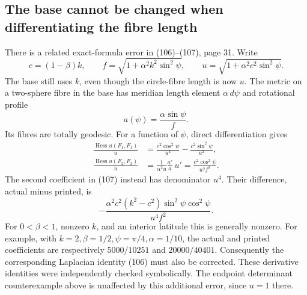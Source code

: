 \documentclass[10pt]{article}
\begin{document}
\subsection*{The base cannot be changed when differentiating the fibre length}
There is a related exact-formula error in (106)–(107), page 31. Write \[c=(1-\beta)k,\qquad
f=\sqrt{1+\alpha^2k^2\sin^2\psi},\qquad
u=\sqrt{1+\alpha^2c^2\sin^2\psi}.\] The base still uses \(k\), even though the circle-fibre length is now \(u\). The metric on a two-sphere fibre in the base has meridian length element \(\alpha\,d\psi\) and rotational profile \[a(\psi)=\frac{\alpha\sin\psi}{f}.\] Its fibres are totally geodesic. For a function of \(\psi\), direct differentiation gives \[\begin{aligned}
\frac{\operatorname{Hess}u(F_1,F_1)}{u}
 &=\frac{c^2\cos^2\psi}{u^4}-\frac{c^2\sin^2\psi}{u^2},\\
\frac{\operatorname{Hess}u(F_2,F_2)}{u}
 &=\frac{1}{\alpha^2u}\frac{a'}a\,u'
 =\frac{c^2\cos^2\psi}{u^2f^2}.\end{aligned}\] The second coefficient in (107) instead has denominator \(u^4\). Their difference, actual minus printed, is \[-\frac{\alpha^2c^2(k^2-c^2)\sin^2\psi\cos^2\psi}{u^4f^2}.\] For \(0<\beta<1\), nonzero \(k\), and an interior latitude this is generally nonzero. For example, with \(k=2,\beta=1/2,\psi=\pi/4,\alpha=1/10\), the actual and printed coefficients are respectively \(5000/10251\) and \(20000/40401\). Consequently the corresponding Laplacian identity (106) must also be corrected. These derivative identities were independently checked symbolically. The endpoint determinant counterexample above is unaffected by this additional error, since \(u=1\) there.\par
\end{document}
